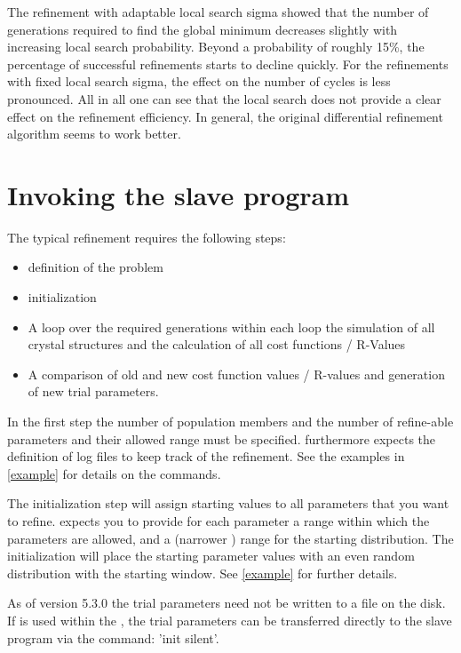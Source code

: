 The refinement with adaptable local search sigma showed that the number
of generations required to find the global minimum decreases slightly
with increasing local search probability. Beyond a probability of roughly
15\%, the percentage of successful refinements starts to decline quickly.
For the refinements with fixed local search sigma, the effect on the
number of cycles is less pronounced. All in all one can see that the local 
search does not provide a clear effect on the refinement efficiency. 
In general, the original differential refinement algorithm seems to 
work better. 

\section{Invoking the slave program \label{diff-invoke}}

The typical refinement requires the following steps:

\begin{itemize}
 \item definition of the problem
 \item initialization 
 \item A loop over the required generations
within each loop the simulation of all crystal structures and the calculation 
of all cost functions / R-Values
 \item A comparison of old and new cost function values / R-values and generation
of new trial parameters.
\end{itemize}

In the first step the number of population members and the number of refine-able
parameters and their allowed range must be specified. \Diffev furthermore 
expects the definition of log files to keep track of the refinement. See the
examples in \ref{example} for details on the commands.

The initialization step will assign starting values to all parameters that you
want to refine. \Diffev expects you to provide for each parameter a range 
within which the parameters are allowed, and a (narrower ) range for the 
starting distribution. The initialization will place the starting parameter 
values with an even random distribution with the starting window. See
\ref{example} for further details. 

As of version  5.3.0 the trial parameters need not be written to a file on
the disk. If \Diffev is used within the \suite, the trial parameters
can be transferred directly to the slave program via the command:
'init silent'.

